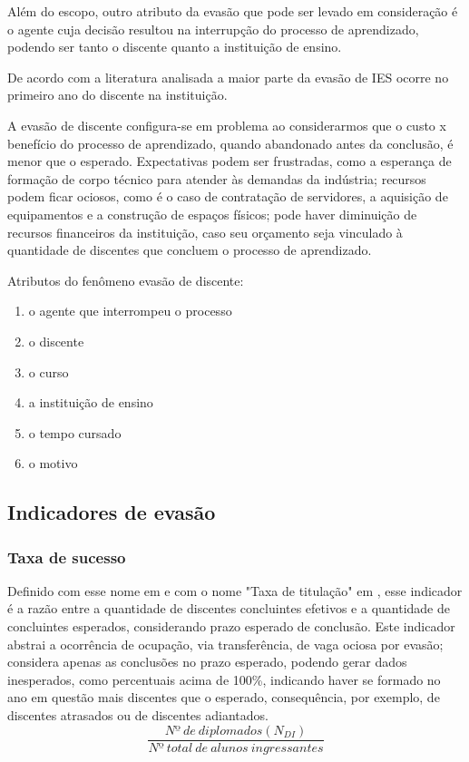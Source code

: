 \documentclass{report}
\begin{document}
Além do escopo, outro atributo da evasão que pode ser levado em consideração é o agente cuja decisão resultou na interrupção do processo de aprendizado, podendo ser tanto o discente quanto a instituição de ensino.


De acordo com a literatura analisada \cite{tinto_leaving} \cite{evasao_panorama} a maior parte da evasão de IES ocorre no primeiro ano do discente na instituição.

A evasão de discente configura-se em problema ao considerarmos que o custo x benefício do processo de aprendizado, quando abandonado antes da conclusão, é menor que o esperado. Expectativas podem ser frustradas, como a esperança de formação de corpo técnico para atender às demandas da indústria; recursos podem ficar ociosos, como é o caso de contratação de servidores, a aquisição de equipamentos e a construção de espaços físicos; pode haver diminuição de recursos financeiros da instituição, caso seu orçamento seja vinculado à quantidade de discentes que concluem o processo de aprendizado. 

Atributos do fenômeno evasão de discente:

\begin{enumerate}
\item o agente que interrompeu o processo
\item o discente
\item o curso
\item a instituição de ensino
\item o tempo cursado
\item o motivo
\end{enumerate}

\subsection{Indicadores de evasão}

\subsubsection{Taxa de sucesso}

Definido com esse nome em \cite{indicadores_TCU} e com o nome "Taxa de titulação" em \cite{mudanca_calculos}, esse indicador é a razão entre a quantidade de discentes concluintes efetivos e a quantidade de concluintes esperados, considerando prazo esperado de conclusão.
Este indicador abstrai a ocorrência de ocupação, via transferência, de vaga ociosa por evasão; considera apenas as conclusões no prazo esperado, podendo gerar dados inesperados, como percentuais acima de 100\%, indicando haver se formado no ano em questão mais discentes que o esperado, consequência, por exemplo, de discentes atrasados ou de discentes adiantados.
\begin{equation}
\frac{Nº\ de\ diplomados(N_{DI})}{Nº\ total\ de\ alunos\ ingressantes}
\end{equation}
\end{document}
